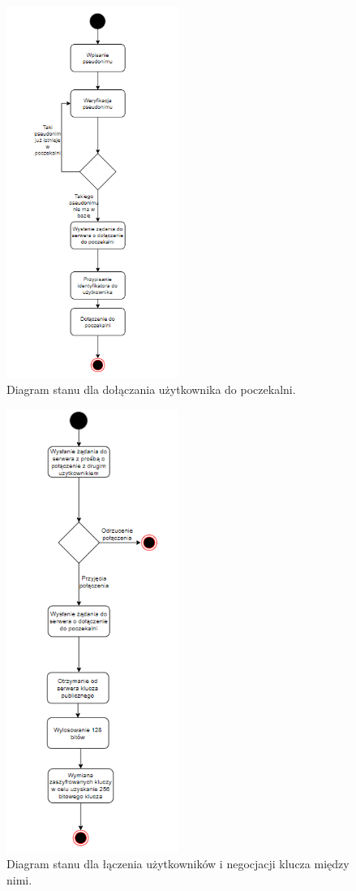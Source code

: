 \begin{figure}[H]
	\includegraphics[width=0.5\textwidth]{images/stan1.png}
	\centering	
	\caption{\centering Diagram stanu dla dołączania użytkownika do poczekalni.}
\end{figure}

\begin{figure}[H]
	\includegraphics[width=0.5\textwidth]{images/stan2.png}
	\centering	
	\caption{\centering Diagram stanu dla łączenia użytkowników i negocjacji klucza między nimi.}
\end{figure}